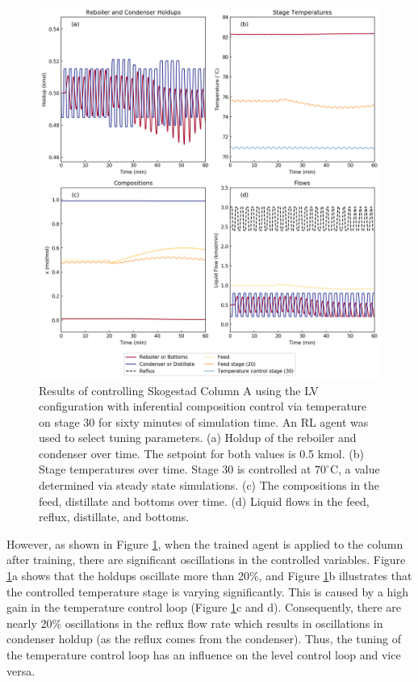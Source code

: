 \begin{figure}[p]
  \includegraphics[width=\textwidth]{gfx/Chapter05/20200424_trained_policy_sixty_minutes.png}
  \caption{Results of controlling Skogestad Column A using the LV configuration with inferential composition control via temperature on stage 30 for sixty minutes of simulation time. An RL agent was used to select tuning parameters. (a) Holdup of the reboiler and condenser over time. The setpoint for both values is 0.5 kmol. (b) Stage temperatures over time. Stage 30 is controlled at $70^{\circ}$C, a value determined via steady state simulations. (c) The compositions in the feed, distillate and bottoms over time. (d) Liquid flows in the feed, reflux, distillate, and bottoms.}
  \label{trained_policy}
\end{figure} 

However, as shown in Figure \ref{trained_policy}, when the trained agent is applied to the column after training, there are significant oscillations in the controlled variables. Figure \ref{trained_policy}a shows that the holdups oscillate more than 20\%, and Figure \ref{trained_policy}b illustrates that the controlled temperature stage is varying significantly. This is caused by a high gain in the temperature control loop (Figure \ref{trained_policy}c and d). Consequently, there are nearly 20\% oscillations in the reflux flow rate which results in oscillations in condenser holdup (as the reflux comes from the condenser). Thus, the tuning of the temperature control loop has an influence on the level control loop and vice versa.

